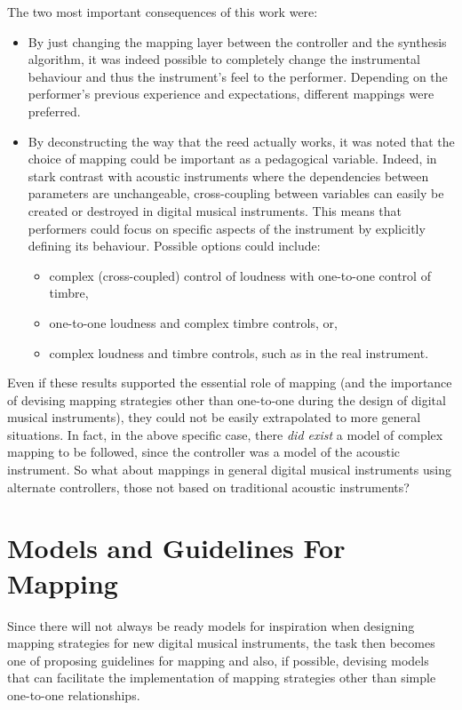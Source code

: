 The two most important consequences of this work were:

\begin{itemize}
	\item By just changing the mapping layer between the controller and the synthesis
algorithm, it was indeed possible to completely change the instrumental behaviour
and thus the instrument's feel to the performer. Depending on the performer's
previous experience and expectations, different mappings were preferred.

\item By deconstructing the way that the reed actually works, it was noted that the
choice of mapping could be important as a pedagogical variable. Indeed, in stark
contrast with acoustic instruments where the dependencies between parameters are
unchangeable, cross-coupling between variables can easily be created or destroyed
in digital musical instruments. This means that performers could focus on
specific aspects of the instrument by explicitly defining its behaviour. Possible
options could include:

\begin{itemize}
	\item complex (cross-coupled) control of loudness with one-to-one control of timbre,
	\item one-to-one loudness and complex timbre controls, or,
	\item complex loudness and timbre controls, such as in the real instrument.
\end{itemize}

\end{itemize}


Even if these results supported the essential role of mapping (and the
importance of devising mapping strategies other than one-to-one during the design
of digital musical instruments), they could not be easily extrapolated to more
general situations. In fact, in the above specific case, there \textit{did exist}
a model of complex mapping to be followed, since the controller was a model of
the acoustic instrument. So what about mappings in general digital musical
instruments using alternate controllers, those not based on traditional acoustic
instruments?

\section{Models and Guidelines For Mapping}

Since there will not always be ready models for inspiration when designing
mapping strategies for new digital musical instruments, the task then becomes one
of proposing guidelines for mapping and also, if possible, devising models that
can facilitate the implementation of mapping strategies other than simple
one-to-one relationships.

